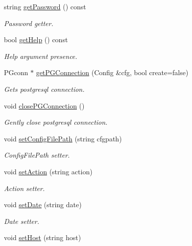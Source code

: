 \begin{DoxyCompactItemize}
string \hyperlink{classfwi_1_1CommandLineArguments_a951d2991fe796cc021f64b078a1a55e0}{get\-Password} () const 
\begin{DoxyCompactList}\small\item\em Password getter. \end{DoxyCompactList}\item 
bool \hyperlink{classfwi_1_1CommandLineArguments_a683c730b0b79a90b48dc8596dd994bc4}{get\-Help} () const 
\begin{DoxyCompactList}\small\item\em Help argument presence. \end{DoxyCompactList}\item 
P\-Gconn $\ast$ \hyperlink{classfwi_1_1CommandLineArguments_a071867c84d4756190ddf6e57a2132131}{get\-P\-G\-Connection} (Config \&cfg, bool create=false)
\begin{DoxyCompactList}\small\item\em Gets postgresql connection. \end{DoxyCompactList}\item 
void \hyperlink{classfwi_1_1CommandLineArguments_a31c6f8e8c94e7ca5540c4f84c836f1d3}{close\-P\-G\-Connection} ()
\begin{DoxyCompactList}\small\item\em Gently close postgresql connection. \end{DoxyCompactList}\item 
void \hyperlink{classfwi_1_1CommandLineArguments_ad2548a77ea9819bb6356ffe1ebe2124b}{set\-Config\-File\-Path} (string cfgpath)
\begin{DoxyCompactList}\small\item\em Config\-File\-Path setter. \end{DoxyCompactList}\item 
void \hyperlink{classfwi_1_1CommandLineArguments_a94983023c52fd20932d4e64cf5d566ad}{set\-Action} (string action)
\begin{DoxyCompactList}\small\item\em Action setter. \end{DoxyCompactList}\item 
void \hyperlink{classfwi_1_1CommandLineArguments_af378e847bef06548a276f6ee4ccc72fe}{set\-Date} (string date)
\begin{DoxyCompactList}\small\item\em Date setter. \end{DoxyCompactList}\item 
void \hyperlink{classfwi_1_1CommandLineArguments_a7942eb8218a54ba9843c506396f66f37}{set\-Host} (string host)

\end{DoxyCompactItemize}
